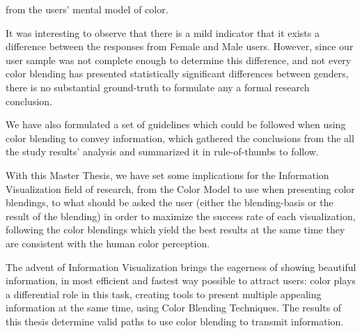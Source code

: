 from the users' mental model of color. \par
%
It was interesting to observe that there is a mild indicator that it exists a difference between the responses from Female and Male users. However,
since our user sample was not complete enough to determine this difference, and not every color blending has presented statistically significant
differences between genders, there is no substantial ground-truth to formulate any a formal research conclusion. \par
%
We have also formulated a set of guidelines which could be followed when using color blending to convey information, which gathered the conclusions
from the all the study results' analysis and summarized it in rule-of-thumbs to follow. \par
%
With this Master Thesis, we have set some implications for the Information Visualization field of research, from the Color Model to use when presenting
color blendings, to what should be asked the user (either the blending-basis or the result of the blending) in order to maximize the success rate of
each visualization, following the color blendings which yield the best results at the same time they are consistent with the human color perception. \par
%
The advent of Information Visualization brings the eagerness of showing beautiful information, in most efficient and fastest way possible to attract
users: color plays a differential role in this task, creating tools to present multiple appealing information at the same time, using Color Blending
Techniques. The results of this thesis determine valid paths to use color blending to transmit information.
%
